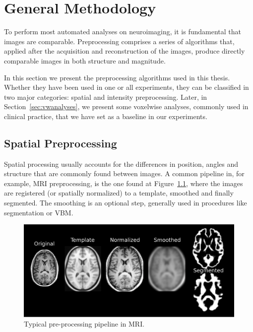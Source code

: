 \chapter{General Methodology}\label{ch:preprocessing} %
To perform most automated analyses on neuroimaging, it is fundamental that images are comparable. Preprocessing comprises a series of algorithms that, applied after the acquisition and reconstruction of the images, produce directly comparable images in both structure and magnitude. 

In this section we present the preprocessing algorithms used in this thesis. Whether they have been used in one or all experiments, they can be classified in two major categories: spatial and intensity preprocessing. Later, in Section~\ref{sec:vwanalyses}, we present some voxelwise analyses, commonly used in clinical practice, that we have set as a baseline in our experiments. 

\section{Spatial Preprocessing }
Spatial processing usually accounts for the differences in position, angles and structure that are commonly found between images. A common pipeline in, for example, \ac{MRI} preprocessing, is the one found at Figure~\ref{fig:examplePreMRI}, where the images are registered (or spatially normalized) to a template, smoothed and finally segmented. The smoothing is an optional step, generally used in procedures like segmentation or \ac{VBM}. 

\begin{figure}[htp]
	\myfloatalign
	\includegraphics[width=.75\linewidth]{Graphics/ch3/preProcessPL}
	\caption[Typical pre-processing pipeline in MRI]{Typical pre-processing pipeline in \ac{MRI}.}\label{fig:examplePreMRI}
\end{figure}

